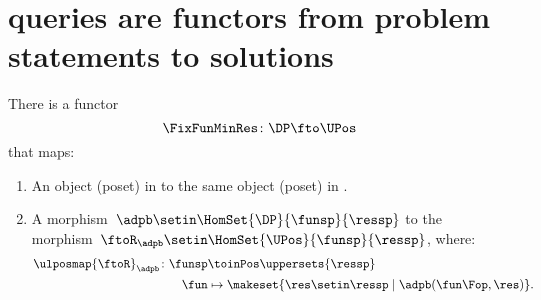 \section[Queries as functors]{\DP queries are functors from problem statements to solutions}

\begin{lemma}
    \label{lem:covfunctor}
    There is a functor
    \begin{equation}
        \FixFunMinRes\colon \DP \fto \UPos
    \end{equation}
    that maps:
    \begin{enumerate}
        \item An object (poset) in \DP to the same object (poset) in \UPos.
        \item A morphism~$\adpb\setin \HomSet{\DP}{\funsp}{\ressp}$ to the morphism~$\ftoR_{\adpb}\setin \HomSet{\UPos}{\funsp}{\ressp}$, where:
              \begin{equation}
                  \begin{aligned}
                      \ulposmap{\ftoR}_{\adpb}\colon \funsp & \toinPos \uppersets{\ressp} \\
                      \fun                                  & \mapsto \makeset{\res \setin \ressp\mid \adpb(\fun\Fop,\res)}.
                  \end{aligned}
              \end{equation}
    \end{enumerate}
\end{lemma}

